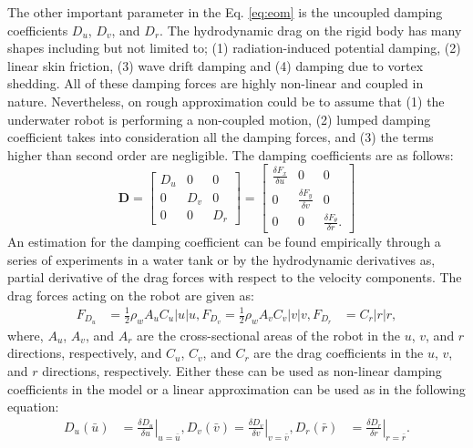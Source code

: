 \documentclass[pdflatex,sn-mathphys-num]{sn-jnl}
\theoremstyle{thmstyleone}%
\begin{document}
\par The other important parameter in the Eq. \ref{eq:eom} is the uncoupled damping coefficients $D_u$, $D_v$, and $D_r$. The hydrodynamic drag on the rigid body has many shapes including but not limited to; (1) radiation-induced potential damping, (2) linear skin friction, (3) wave drift damping and (4) damping due to vortex shedding. All of these damping forces are highly non-linear and coupled in nature. Nevertheless, on rough approximation could be to assume that (1) the underwater robot is performing a non-coupled motion, (2) lumped damping coefficient takes into consideration all the damping forces, and (3) the terms higher than second order are negligible. The damping coefficients are as follows:
\begin{equation}
    \mathbf{{D}} =
    \begin{bmatrix}
        D_u & 0 & 0 \\
        0 & D_v & 0 \\
        0 & 0 & D_r
    \end{bmatrix} =
    \begin{bmatrix}
        \frac{\delta F_x}{\delta u} & 0 & 0 \\
        0 & \frac{\delta F_y}{\delta v} & 0 \\
        0 & 0 & \frac{\delta F_\theta}{\delta r}.
    \end{bmatrix}
\end{equation}
An estimation for the damping coefficient can be found empirically through a series of experiments in a water tank or by the hydrodynamic derivatives as, partial derivative of the drag forces with respect to the velocity components. The drag forces acting on the robot are given as:
\begin{equation*}
    \begin{aligned}
        F_{D_u} &= \frac{1}{2} \rho_w A_u C_u |u| u, 
        F_{D_v} = \frac{1}{2} \rho_w A_v C_v |v| v, 
        F_{D_r} &= C_r |r| r,
    \end{aligned}
\end{equation*}
where, $A_u$, $A_v$, and $A_r$ are the cross-sectional areas of the robot in the $u$, $v$, and $r$ directions, respectively, and $C_u$, $C_v$, and $C_r$ are the drag coefficients in the $u$, $v$, and $r$ directions, respectively. Either these can be used as non-linear damping coefficients in the model or a linear approximation can be used as in the following equation:
\begin{equation*}
    \begin{aligned}
        D_{u}(\bar{u}) &= \left. \frac{\delta D_u}{\delta u} \right|_{u = \bar{u}}, 
        D_{v}(\bar{v}) = \left. \frac{\delta D_v}{\delta v} \right|_{v = \bar{v}},
        D_{r}(\bar{r}) &= \left. \frac{\delta D_r}{\delta r} \right|_{r = \bar{r}}.
    \end{aligned}
\end{equation*}
\end{document}
